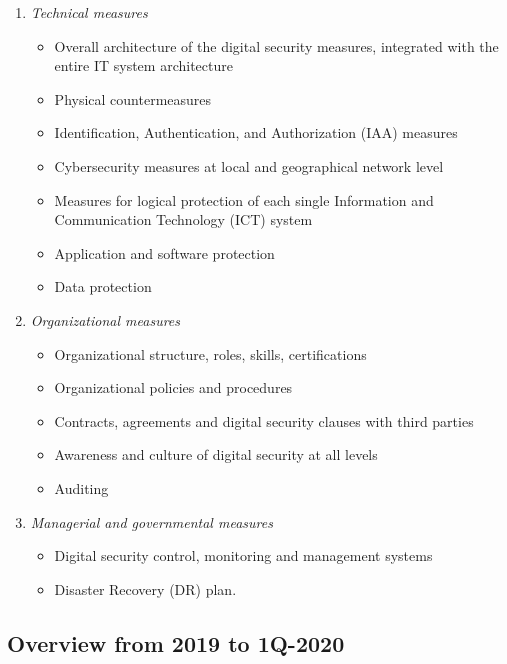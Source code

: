 \documentclass{easychair}
\begin{document}
\begin{enumerate}
\small
	\item \emph{Technical measures}
	\begin{itemize}
		\item Overall architecture of the digital security measures, integrated with the entire IT system architecture
		\item Physical countermeasures
		\item Identification, Authentication, and Authorization (IAA) measures
		\item Cybersecurity measures at local and geographical network level
		\item Measures for logical protection of each single Information and Communication Technology (ICT) system
		\item Application and software protection
		\item Data protection
	\end{itemize}
	\item \emph{Organizational measures}
	\begin{itemize}
		\item Organizational structure, roles, skills, certifications
		\item Organizational policies and procedures
		\item Contracts, agreements and digital security clauses with third parties
		\item Awareness and culture of digital security at all levels
		\item Auditing
	\end{itemize}
	\item \emph{Managerial and governmental measures}
	\begin{itemize}
		\item Digital security control, monitoring and management systems
		\item Disaster Recovery (DR) plan.
	\end{itemize}
\end{enumerate}

\subsection{Overview from 2019 to 1Q-2020}
\end{document}
